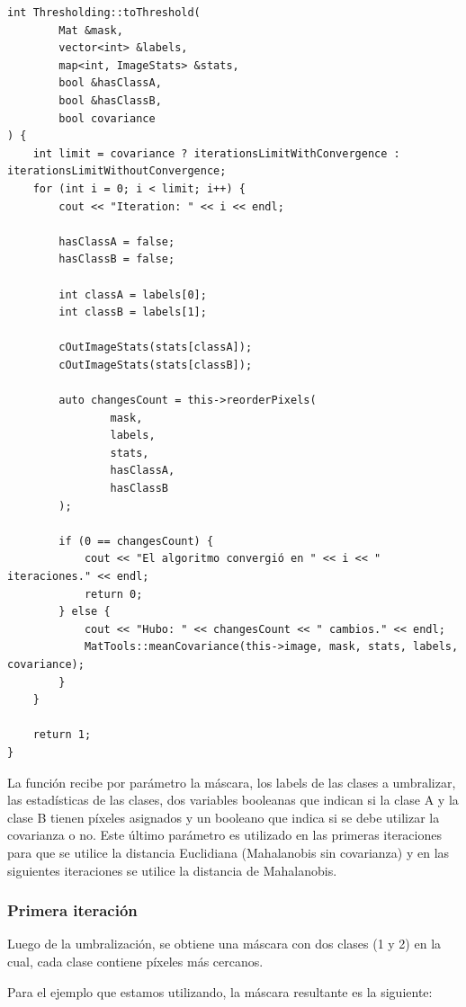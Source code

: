 \begin{lstlisting}[float=H,caption={Mahalanobis Distance},label={lst:thresholding}]
int Thresholding::toThreshold(
        Mat &mask,
        vector<int> &labels,
        map<int, ImageStats> &stats,
        bool &hasClassA,
        bool &hasClassB,
        bool covariance
) {
    int limit = covariance ? iterationsLimitWithConvergence : iterationsLimitWithoutConvergence;
    for (int i = 0; i < limit; i++) {
        cout << "Iteration: " << i << endl;

        hasClassA = false;
        hasClassB = false;

        int classA = labels[0];
        int classB = labels[1];

        cOutImageStats(stats[classA]);
        cOutImageStats(stats[classB]);

        auto changesCount = this->reorderPixels(
                mask,
                labels,
                stats,
                hasClassA,
                hasClassB
        );

        if (0 == changesCount) {
            cout << "El algoritmo convergió en " << i << " iteraciones." << endl;
            return 0;
        } else {
            cout << "Hubo: " << changesCount << " cambios." << endl;
            MatTools::meanCovariance(this->image, mask, stats, labels, covariance);
        }
    }

    return 1;
}
\end{lstlisting}

La función recibe por parámetro la máscara, los labels de las clases a umbralizar, las estadísticas de las clases, dos variables booleanas que indican si la clase A y la clase B tienen píxeles asignados y un booleano que indica si se debe utilizar la covarianza o no.
Este último parámetro es utilizado en las primeras iteraciones para que se utilice la distancia Euclidiana (Mahalanobis sin covarianza) y en las siguientes iteraciones se utilice la distancia de Mahalanobis.

\subsubsection{Primera iteración}\label{subsubsec:first-iteration}

Luego de la umbralización, se obtiene una máscara con dos clases (1 y 2) en la cual, cada clase contiene píxeles más cercanos.

Para el ejemplo que estamos utilizando, la máscara resultante es la siguiente:

